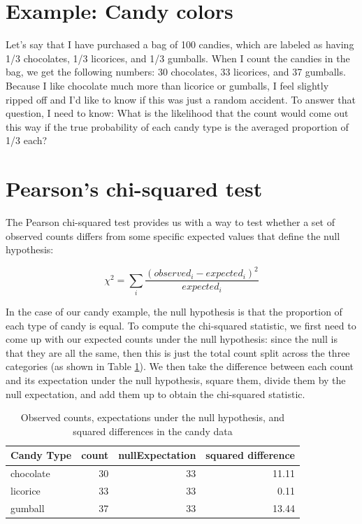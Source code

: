 \documentclass[12pt,]{book}
\theoremstyle{definition}
\theoremstyle{definition}
\theoremstyle{definition}
\theoremstyle{remark}
\begin{document}
\hypertarget{example-candy-colors}{%
\section{Example: Candy colors}\label{example-candy-colors}}

Let's say that I have purchased a bag of 100 candies, which are labeled as having 1/3 chocolates, 1/3 licorices, and 1/3 gumballs. When I count the candies in the bag, we get the following numbers: 30 chocolates, 33 licorices, and 37 gumballs. Because I like chocolate much more than licorice or gumballs, I feel slightly ripped off and I'd like to know if this was just a random accident. To answer that question, I need to know: What is the likelihood that the count would come out this way if the true probability of each candy type is the averaged proportion of 1/3 each?

\hypertarget{chi-squared-test}{%
\section{Pearson's chi-squared test}\label{chi-squared-test}}

The Pearson chi-squared test provides us with a way to test whether a set of observed counts differs from some specific expected values that define the null hypothesis:

\[
\chi^2 = \sum_i\frac{(observed_i - expected_i)^2}{expected_i}
\]

In the case of our candy example, the null hypothesis is that the proportion of each type of candy is equal. To compute the chi-squared statistic, we first need to come up with our expected counts under the null hypothesis: since the null is that they are all the same, then this is just the total count split across the three categories (as shown in Table \ref{tab:candyDf}). We then take the difference between each count and its expectation under the null hypothesis, square them, divide them by the null expectation, and add them up to obtain the chi-squared statistic.

\begin{table}

\caption{\label{tab:candyDf}Observed counts, expectations under the null hypothesis, and squared differences in the candy data}
\centering
\begin{tabular}[t]{l|r|r|r}
\hline
Candy Type & count & nullExpectation & squared difference\\
\hline
chocolate & 30 & 33 & 11.11\\
\hline
licorice & 33 & 33 & 0.11\\
\hline
gumball & 37 & 33 & 13.44\\
\hline
\end{tabular}
\end{table}
\end{document}
